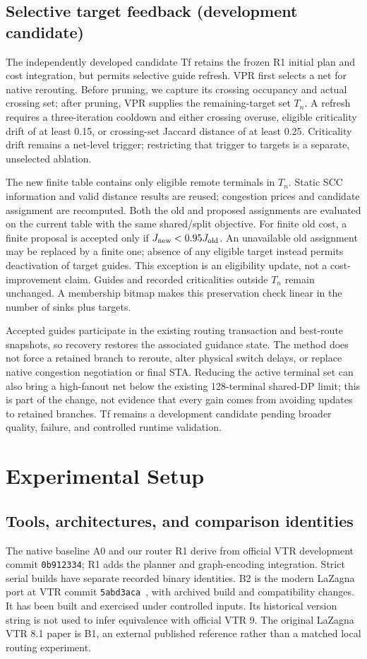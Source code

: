 \documentclass[conference,10pt]{IEEEtran}
\begin{document}
\subsection{Selective target feedback (development candidate)}
The independently developed candidate Tf retains the frozen R1 initial plan and cost integration, but permits selective guide refresh. VPR first selects a net for native rerouting. Before pruning, we capture its crossing occupancy and actual crossing set; after pruning, VPR supplies the remaining-target set $T_n$. A refresh requires a three-iteration cooldown and either crossing overuse, eligible criticality drift of at least 0.15, or crossing-set Jaccard distance of at least 0.25. Criticality drift remains a net-level trigger; restricting that trigger to targets is a separate, unselected ablation.

The new finite table contains only eligible remote terminals in $T_n$. Static SCC information and valid distance results are reused; congestion prices and candidate assignment are recomputed. Both the old and proposed assignments are evaluated on the current table with the same shared/split objective. For finite old cost, a finite proposal is accepted only if $J_{\rm new}<0.95J_{\rm old}$. An unavailable old assignment may be replaced by a finite one; absence of any eligible target instead permits deactivation of target guides. This exception is an eligibility update, not a cost-improvement claim. Guides and recorded criticalities outside $T_n$ remain unchanged. A membership bitmap makes this preservation check linear in the number of sinks plus targets.

Accepted guides participate in the existing routing transaction and best-route snapshots, so recovery restores the associated guidance state. The method does not force a retained branch to reroute, alter physical switch delays, or replace native congestion negotiation or final STA. Reducing the active terminal set can also bring a high-fanout net below the existing 128-terminal shared-DP limit; this is part of the change, not evidence that every gain comes from avoiding updates to retained branches. Tf remains a development candidate pending broader quality, failure, and controlled runtime validation.

\clearpage
\section{Experimental Setup}
\subsection{Tools, architectures, and comparison identities}
The native baseline A0 and our router R1 derive from official VTR development commit \texttt{0b912334}; R1 adds the planner and graph-encoding integration. Strict serial builds have separate recorded binary identities. B2 is the modern LaZagna port at VTR commit \texttt{5abd3aca}~\cite{modern}, with archived build and compatibility changes. It has been built and exercised under controlled inputs. Its historical version string is not used to infer equivalence with official VTR 9. The original LaZagna VTR 8.1 paper is B1, an external published reference rather than a matched local routing experiment.
\end{document}
